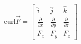 \documentclass[preview]{standalone}
\begin{document}
\begin{center}
$ \text{curl} \vec{F} = \begin{bmatrix} \hat{i} & \hat{j} & \hat{k}\\ \frac{\partial}{\partial x} & \frac{\partial}{\partial y} & \frac{\partial}{\partial z}\\ F_{x} & F_{y} & F_{z} \end{bmatrix}$
\end{center}
\end{document}
